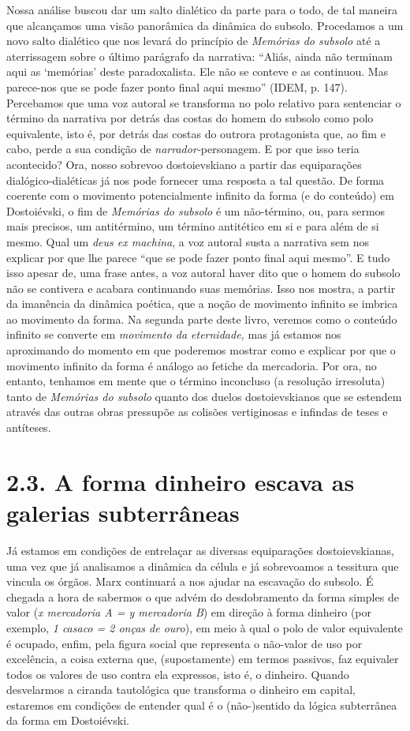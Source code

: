 Nossa análise buscou dar um salto dialético da parte para o todo, de tal
maneira que alcançamos uma visão panorâmica da dinâmica do subsolo.
Procedamos a um novo salto dialético que nos levará do princípio de
\emph{Memórias do subsolo} até a aterrissagem sobre o último parágrafo
da narrativa: ``Aliás, ainda não terminam aqui as `memórias' deste
paradoxalista. Ele não se conteve e as continuou. Mas parece-nos que se
pode fazer ponto final aqui mesmo'' (IDEM, p. 147). Percebamos que uma
voz autoral se transforma no polo relativo para sentenciar o término da
narrativa por detrás das costas do homem do subsolo como polo
equivalente, isto é, por detrás das costas do outrora protagonista que,
ao fim e cabo, perde a sua condição de \emph{narrador-}personagem. E por
que isso teria acontecido? Ora, nosso sobrevoo dostoievskiano a partir
das equiparações dialógico-dialéticas já nos pode fornecer uma resposta
a tal questão. De forma coerente com o movimento potencialmente infinito
da forma (e do conteúdo) em Dostoiévski, o fim de \emph{Memórias do
subsolo} é um não-término, ou, para sermos mais precisos, um
antitérmino, um término antitético em si e para além de si mesmo. Qual
um \emph{deus ex machina}, a voz autoral susta a narrativa sem nos
explicar por que lhe parece ``que se pode fazer ponto final aqui
mesmo''. E tudo isso apesar de, uma frase antes, a voz autoral haver
dito que o homem do subsolo não se contivera e acabara continuando suas
memórias. Isso nos mostra, a partir da imanência da dinâmica poética,
que a noção de movimento infinito se imbrica ao movimento da forma. Na
segunda parte deste livro, veremos como o conteúdo infinito se converte
em \emph{movimento da eternidade,} mas já estamos nos aproximando do
momento em que poderemos mostrar como e explicar por que o movimento
infinito da forma é análogo ao fetiche da mercadoria. Por ora, no
entanto, tenhamos em mente que o término inconcluso (a resolução
irresoluta) tanto de \emph{Memórias do subsolo} quanto dos duelos
dostoievskianos que se estendem através das outras obras pressupõe as
colisões vertiginosas e infindas de teses e antíteses.

\section{2.3. A forma dinheiro escava as galerias subterrâneas}

Já estamos em condições de entrelaçar as diversas equiparações
dostoievskianas, uma vez que já analisamos a dinâmica da célula e já
sobrevoamos a tessitura que vincula os órgãos. Marx continuará a nos
ajudar na escavação do subsolo. É chegada a hora de sabermos o que advém
do desdobramento da forma simples de valor (\emph{x mercadoria A = y
mercadoria B}) em direção à forma dinheiro (por exemplo, \emph{1 casaco
= 2 onças de ouro}), em meio à qual o polo de valor equivalente é
ocupado, enfim, pela figura social que representa o não-valor de uso por
excelência, a coisa externa que, (supostamente) em termos passivos, faz
equivaler todos os valores de uso contra ela expressos, isto é, o
dinheiro. Quando desvelarmos a ciranda tautológica que transforma o
dinheiro em capital, estaremos em condições de entender qual é o
(não-)sentido da lógica subterrânea da forma em Dostoiévski.

